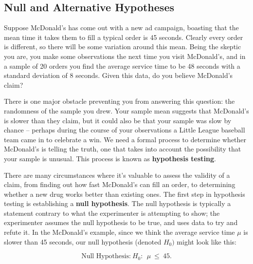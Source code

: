

\subsection{Null and Alternative Hypotheses}



Suppose McDonald's has come out with a new ad campaign, boasting that the mean time it takes them to fill a typical order is 45 seconds. Clearly every order is different, so there will be some variation around this mean. Being the skeptic you are, you make some observations the next time you visit McDonald's, and in a sample of 20 orders you find the average service time to be 48 seconds with a standard deviation of 8 seconds. Given this data, do you believe McDonald's claim?



There is one major obstacle preventing you from answering this question: the randomness of the sample you drew. Your sample mean suggests that McDonald's is slower than they claim, but it could also be that your sample was slow by chance -- perhaps during the course of your observations a Little League baseball team came in to celebrate a win. We need a formal process to determine whether McDonald's is telling the truth, one that takes into account the possibility that your sample is unusual. This process is known as \textbf{hypothesis testing}.



There are many circumstances where it's valuable to assess the validity of a claim, from finding out how fast McDonald's can fill an order, to determining whether a new drug works better than existing ones. The first step in hypothesis testing is establishing a \textbf{null hypothesis}. The null hypothesis is typically a statement contrary to what the experimenter is attempting to show; the experimenter assumes the null hypothesis to be true, and uses data to try and refute it. In the McDonald's example, since we think the average service time $\mu$ is slower than 45 seconds, our null hypothesis (denoted $H_{0})$ might look like this:

\begin{equation*}

\textrm{Null\ \ Hypothesis:}\ H_0:\ \ \mu \ \leq\ 45.

\end{equation*}



